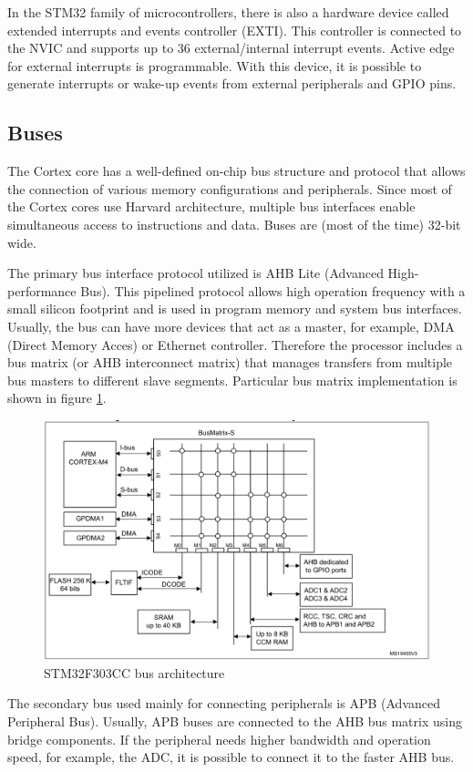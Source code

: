 In the  STM32 family of microcontrollers, there is also a hardware device called extended interrupts and events controller (EXTI). This controller is connected to the NVIC and supports up to 36 external/internal interrupt events. Active edge for external interrupts is programmable. With this device, it is possible to generate interrupts or wake-up events from external peripherals and GPIO pins.

	\subsection{Buses}
	\label{sub:buses}
The Cortex core has a well-defined on-chip bus structure and protocol that allows the connection of various memory configurations and peripherals. Since most of the Cortex cores use Harvard architecture, multiple bus interfaces enable simultaneous access to instructions and data. Buses are (most of the time) 32-bit wide.

The primary bus interface protocol utilized is AHB Lite (Advanced High-performance Bus). This pipelined protocol allows high operation frequency with a small silicon footprint and is used in program memory and system bus interfaces. Usually, the bus can have more devices that act as a master, for example, DMA (Direct Memory Acces) or Ethernet controller. Therefore the processor includes a bus matrix (or AHB interconnect matrix) that manages transfers from multiple bus masters to different slave segments. Particular bus matrix implementation is shown in figure \ref{fig:f303_busmatrix}.
\begin{figure}
\centering
\includegraphics[width=0.7\linewidth]{support/pic/f303_bus_matrix.png}
\caption{STM32F303CC bus architecture \cite{f303_ref}} %
\label{fig:f303_busmatrix}
\end{figure}

The secondary bus used mainly for connecting peripherals is APB (Advanced Peripheral Bus). Usually, APB buses are connected to the AHB bus matrix using bridge components. If the peripheral needs higher bandwidth and operation speed, for example, the ADC, it is possible to connect it to the faster AHB bus.

